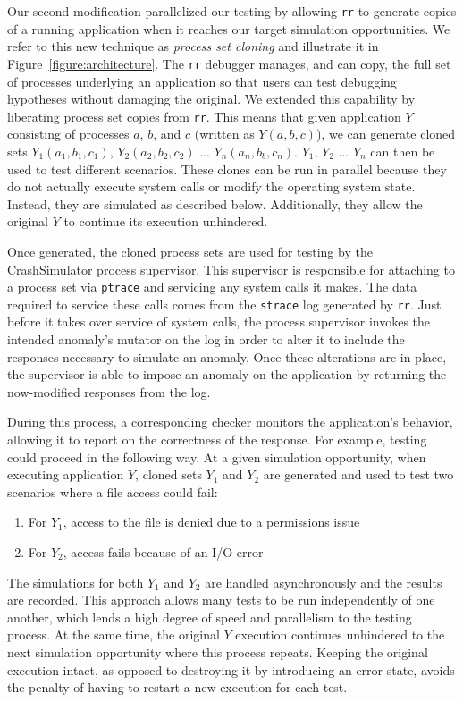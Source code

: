 Our second modification parallelized our testing
by allowing {\tt rr} to generate copies of a running application when
it reaches our target simulation opportunities.
We refer to this new technique as {\it process set cloning}
and illustrate it
in Figure~\ref{figure:architecture}.
The {\tt rr}
debugger manages, and can copy, the full set of processes underlying an
application so that users can test debugging hypotheses without damaging
the original.  We extended this capability by liberating process
set copies from {\tt rr}.  This means that given application $Y$ consisting
of processes $a$, $b$, and $c$ (written as $Y(a, b, c)$), we can generate
cloned sets $Y_1(a_1, b_1, c_1)$, $Y_2(a_2, b_2, c_2)$ ... $Y_n(a_n, b_b,
c_n)$.  $Y_1$, $Y_2$ ... $Y_n$ can then be used to test different
scenarios.  These clones can be run in parallel because they do not
actually execute system calls or modify the operating system state.
Instead, they are simulated as described below.
Additionally,
they allow the original $Y$ to continue its execution unhindered.

Once generated, the cloned process sets are used
for testing by the CrashSimulator process supervisor.
This supervisor is responsible for attaching to a process set
via {\tt ptrace} and
servicing any system calls it makes.
The data required to service these calls
comes from the  {\tt strace} log
generated by {\tt rr}.
Just before it takes over service of system calls,
the process supervisor invokes the intended anomaly's mutator
on the log in order to alter it to include the responses
necessary to simulate an anomaly.
Once these alterations are in place,
the supervisor is able to impose an anomaly
on the application by returning the now-modified responses from the log.

During this process,
a corresponding checker
monitors the application's behavior,
allowing it to report on the correctness of the response.
For example, testing could proceed in the following way.
At a given simulation opportunity, when executing application $Y$,
cloned sets $Y_1$ and $Y_2$ are generated and
used to test two scenarios where a file access could fail:
\begin{enumerate}
    \item{For $Y_1$, access to the file is denied due to a permissions issue}
    \item{For $Y_2$, access fails because of an I/O error}
\end{enumerate}
The simulations for both $Y_1$ and $Y_2$ are handled asynchronously and
the results are recorded.
This approach allows many tests to be run independently of one another,
which lends a
high degree of speed and
parallelism to the testing process.
At the same time, the original $Y$ execution continues unhindered to the
next simulation opportunity where this process repeats.
Keeping the original execution intact,
as opposed to destroying it by introducing an error state,
avoids the penalty
of having to restart a new execution for each test.

